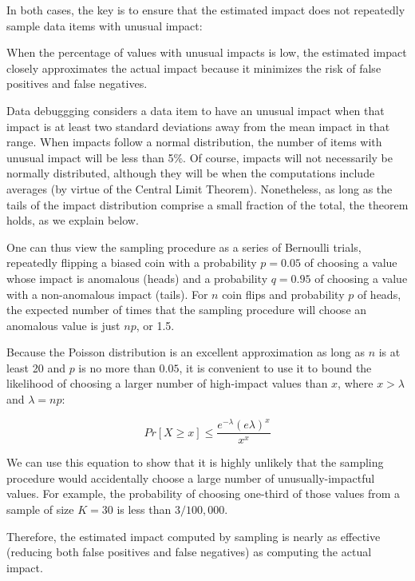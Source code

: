 In both cases, the key is to ensure that the estimated impact does not
repeatedly sample data items with unusual impact:

\begin{theorem}
When the percentage of values with unusual impacts is low, the estimated impact closely approximates the actual impact because it minimizes the risk of false positives and false negatives.
\end{theorem}

Data debuggging considers a data item to have an unusual impact
when that impact is at least two standard deviations away from the mean
impact in that range. When impacts follow a normal distribution, the
number of items with unusual impact will be less than 5\%. Of course,
impacts will not necessarily be normally distributed, although they
will be when the computations include averages (by virtue of the
Central Limit Theorem). Nonetheless, as long as the tails of the impact
distribution comprise a small fraction of the total, the theorem
holds, as we explain below.

One can thus view the sampling procedure as a series of Bernoulli
trials, repeatedly flipping a biased coin with a probability $p =
0.05$ of choosing a value whose impact is anomalous (heads) and a
probability $q = 0.95$ of choosing a value with a non-anomalous impact
(tails). For $n$ coin flips and probability $p$ of heads, the expected
number of times that the sampling procedure will choose an anomalous
value is just $np$, or 1.5.

Because the Poisson distribution is an excellent approximation as long
as $n$ is at least 20 and $p$ is no more than $0.05$, it is convenient
to use it to bound the likelihood of choosing a larger number of
high-impact values than $x$, where $x > \lambda$ and $\lambda = np$:

\begin{equation}
Pr[X \geq x] \leq \frac{e^{-\lambda}(e \lambda)^x}{x^x}
\end{equation}

We can use this equation to show that it is highly unlikely that the
sampling procedure would accidentally choose a large number of
unusually-impactful values. For example, the probability of choosing
one-third of those values from a sample of size $K = 30$ is less than
$3/100,000$.

Therefore, the estimated impact computed by sampling is
nearly as effective (reducing both false positives and false
negatives) as computing the actual impact.

